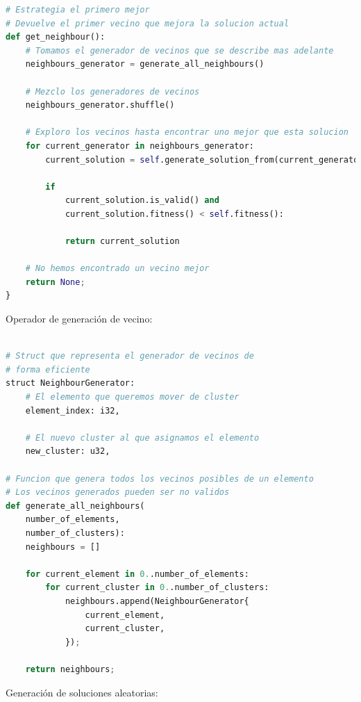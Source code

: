 \documentclass[11pt]{article}
\begin{document}
\begin{lstlisting}[language=Python, style=Boxed]
# Estrategia el primero mejor
# Devuelve el primer vecino que mejora la solucion actual
def get_neighbour():
    # Tomamos el generador de vecinos que se describe mas adelante
    neighbours_generator = generate_all_neighbours()

    # Mezclo los generadores de vecinos
    neighbours_generator.shuffle()

    # Exploro los vecinos hasta encontrar uno mejor que esta solucion
    for current_generator in neighbours_generator:
        current_solution = self.generate_solution_from(current_generator)

        if
            current_solution.is_valid() and
            current_solution.fitness() < self.fitness():

            return current_solution

    # No hemos encontrado un vecino mejor
    return None;
}
\end{lstlisting}

Operador de generación de vecino:

\begin{lstlisting}[language=Python, style=Boxed]

# Struct que representa el generador de vecinos de
# forma eficiente
struct NeighbourGenerator:
    # El elemento que queremos mover de cluster
    element_index: i32,

    # El nuevo cluster al que asignamos el elemento
    new_cluster: u32,

# Funcion que genera todos los vecinos posibles de un elemento
# Los vecinos generados pueden ser no validos
def generate_all_neighbours(
    number_of_elements,
    number_of_clusters):
    neighbours = []

    for current_element in 0..number_of_elements:
        for current_cluster in 0..number_of_clusters:
            neighbours.append(NeighbourGenerator{
                current_element,
                current_cluster,
            });

    return neighbours;
\end{lstlisting}

Generación de soluciones aleatorias:
\end{document}
